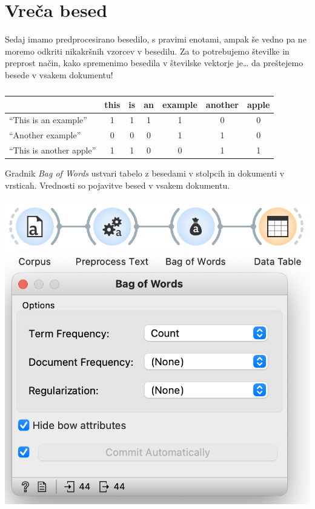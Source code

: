 \chapter{Vreča besed}
\label{ch:vreca-besed}

Sedaj imamo predprocesirano besedilo, s pravimi enotami, ampak še vedno pa ne moremo odkriti nikakršnih vzorcev v besedilu. Za to potrebujemo številke in preprost način, kako spremenimo besedila v številske vektorje je… da preštejemo besede v vsakem dokumentu!

\begin{table}
    \centering
    \begin{tabular}{ l c c c c c c }
        \hline
         &this&is&an&example&another&apple\\
         \hline
        ``This is an example'' & 1 & 1 & 1 & 1 & 0 & 0 \\ 
        ``Another example'' & 0 & 0 & 0 & 1 & 1 & 0 \\
        ``This is another apple'' & 1 & 1 & 0 & 0 & 1 & 1\\
        \hline
    \end{tabular}
    \caption{ }
\end{table}

Gradnik \textit{Bag of Words} ustvari tabelo z besedami v stolpcih in dokumenti v vrsticah. Vrednosti so pojavitve besed v vsakem dokumentu.

\begin{marginfigure}[3cm]
    \includegraphics[width=\linewidth]{vreca-besed-workflow.png}
    \caption{}
\end{marginfigure}

